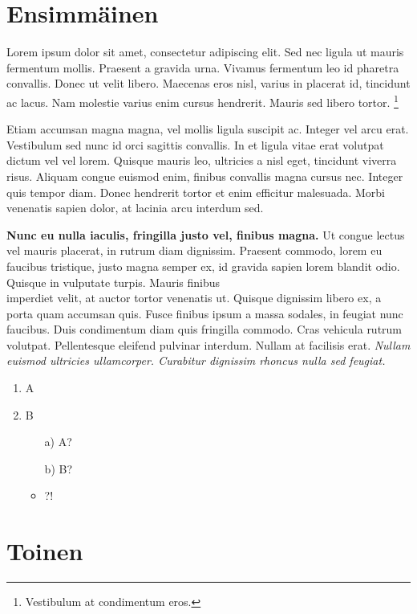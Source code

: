\documentclass[12pt,a4paper,twoside]{article}
\begin{document}
\section{Ensimmäinen}

Lorem ipsum dolor sit amet, consectetur adipiscing elit. Sed nec ligula ut mauris fermentum mollis. Praesent a gravida urna. Vivamus fermentum leo id pharetra convallis. Donec ut velit libero. Maecenas eros nisl, varius in placerat id, tincidunt ac lacus. Nam molestie varius enim cursus hendrerit. Mauris sed libero tortor. \footnote{Vestibulum at condimentum eros.}

Etiam accumsan magna magna, vel mollis ligula suscipit ac. Integer vel arcu erat. Vestibulum sed nunc id orci sagittis convallis. In et ligula vitae erat volutpat dictum vel vel lorem. Quisque mauris leo, ultricies a nisl eget, tincidunt viverra risus. Aliquam congue euismod enim, finibus convallis magna cursus nec. Integer quis tempor diam. Donec hendrerit tortor et enim efficitur malesuada. Morbi venenatis sapien dolor, at lacinia arcu interdum sed.

\textbf{Nunc eu nulla iaculis, fringilla justo vel, finibus magna.} Ut congue lectus vel mauris placerat, in rutrum diam dignissim. Praesent commodo, lorem eu faucibus tristique, justo magna semper ex, id gravida sapien lorem blandit odio. Quisque in vulputate turpis. Mauris finibus \\ imperdiet velit, at auctor tortor venenatis ut. Quisque dignissim libero ex, a porta quam accumsan quis. Fusce finibus ipsum a massa sodales, in feugiat nunc faucibus. Duis condimentum diam quis fringilla commodo. Cras vehicula rutrum volutpat. Pellentesque eleifend pulvinar interdum. Nullam at facilisis erat. \emph{Nullam euismod ultricies ullamcorper. Curabitur dignissim rhoncus nulla sed feugiat.}

\begin{enumerate}
	\item A
	\item B
	\begin{itemize}
		\item[a)] A?
		\item[b)] B?
		\item ?!
	\end{itemize}
\end{enumerate}

\newpage

\section{Toinen}
\end{document}
